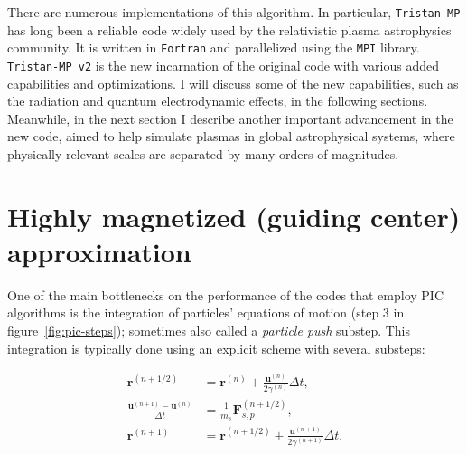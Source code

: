 There are numerous implementations of this algorithm. In particular, \texttt{Tristan-MP} \citep{2005AIPC..801..345S} has long been a reliable code widely used by the relativistic plasma astrophysics community. It is written in \texttt{Fortran} and parallelized using the \texttt{MPI} library. \texttt{Tristan-MP v2} \citep{tristanv2} is the new incarnation of the original code with various added capabilities and optimizations. I will discuss some of the new capabilities, such as the radiation and quantum electrodynamic effects, in the following sections. Meanwhile, in the next section I describe another important advancement in the new code, aimed to help simulate plasmas in global astrophysical systems, where physically relevant scales are separated by many orders of magnitudes.


\section{Highly magnetized (guiding center) approximation}
\label{sec:num-gca-approx}

One of the main bottlenecks on the performance of the codes that employ PIC algorithms is the integration of particles' equations of motion (step 3 in figure~\ref{fig:pic-steps}); sometimes also called a \emph{particle push} substep. This integration is typically done using an explicit scheme with several substeps:

\begin{align}
  \bm{r}^{(n+1/2)} &= \bm{r}^{(n)} + \frac{\bm{u}^{(n)}}{2\gamma^{(n)}}\Delta t,\\
  \frac{\bm{u}^{(n+1)}-\bm{u}^{(n)}}{\Delta t} &= \frac{1}{m_s} \bm{F}_{s,p}^{(n+1/2)},\label{eq:part-push2}\\
  \bm{r}^{(n+1)} &= \bm{r}^{(n+1/2)} + \frac{\bm{u}^{(n+1)}}{2\gamma^{(n+1)}}\Delta t.
\end{align}

